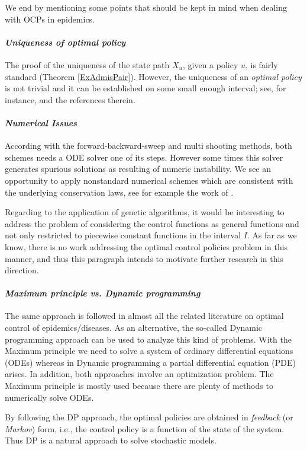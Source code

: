 We end by mentioning some points that should be kept in mind when dealing 
with OCPs in epidemics.

\paragraph{\it Uniqueness of optimal policy}
The proof of the uniqueness of the state path $X_u$, given a policy $u$, is
fairly standard (Theorem \ref{ExAdmisPair}). However, the uniqueness of an 
{\it optimal policy} is not trivial and it can be established on some small 
enough interval; see, for instance, \cite{GaffSchaefer09} and the references 
therein.  
\medskip

\paragraph{\it Numerical Issues}
  According with the forward-backward-sweep and multi shooting methods, both 
schemes needs a ODE solver one of its steps. However some times this solver 
generates spurious solutions as resulting of numeric instability. We see an 
opportunity to  apply nonstandard numerical schemes which are consistent with 
the underlying conservation laws, see for example the work of 
\citet{Mickens2007a}.
  
  Regarding to the application of genetic algorithms, it would be interesting 
to address the problem of considering the control functions as general 
functions and not only restricted to piecewise constant functions in the 
interval $I$. As far as we know, there is no work addressing  the optimal 
control policies problem in this manner, and thus this paragraph intends to 
motivate further research in this direction.
\medskip

\paragraph{\it Maximum principle vs. Dynamic programming} 
  The same approach is followed in almost all the related literature on optimal
control of epidemics/diseases. As an alternative, the so-called Dynamic
programming approach can be used to analyze this kind of problems. With the
Maximum principle we need to solve a system of ordinary differential equations
(ODEs) whereas in Dynamic programming a partial differential equation (PDE)
arises. In addition, both approaches involve an optimization problem. The
Maximum principle is mostly used because there are plenty of methods to
numerically solve ODEs. 

By following the DP approach, the optimal policies are obtained in {\it feedback}
(or {\it Markov}) form, i.e., the control policy is a function of the state of 
the system. Thus DP is a natural approach to solve stochastic models.
